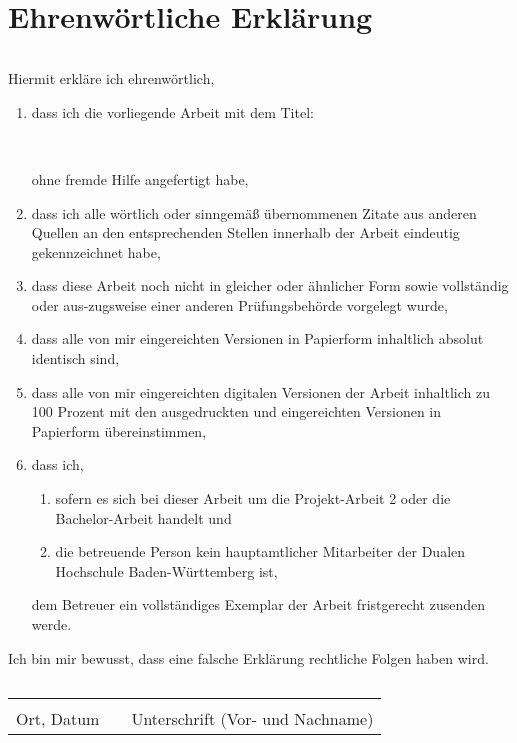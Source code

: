 \section*{Ehrenwörtliche Erklärung}\label{eidesstattliche}

\begin{verbatim}
\end{verbatim}
Hiermit erkläre ich ehrenwörtlich,
\begin{enumerate}
\item dass ich die vorliegende Arbeit mit dem Titel: \\\begin{itshape}\arbeitstitel\\\end{itshape}ohne fremde Hilfe angefertigt habe,
\item dass ich alle wörtlich oder sinngemäß übernommenen Zitate aus anderen Quellen an den entsprechenden Stellen innerhalb der Arbeit eindeutig gekennzeichnet habe,
\item dass diese Arbeit noch nicht in gleicher oder ähnlicher Form sowie vollständig oder aus-zugsweise einer anderen Prüfungsbehörde vorgelegt wurde,
\item dass alle von mir eingereichten Versionen in Papierform inhaltlich absolut identisch sind,
\item dass alle von mir eingereichten digitalen Versionen der Arbeit inhaltlich zu 100 Prozent mit den ausgedruckten und eingereichten Versionen in Papierform übereinstimmen,
\item dass ich,
\begin{enumerate}
\item sofern es sich bei dieser Arbeit um die Projekt-Arbeit 2 oder die Bachelor-Arbeit handelt und
\item die betreuende Person kein hauptamtlicher Mitarbeiter der Dualen Hochschule Baden-Württemberg ist,
\end{enumerate}
dem Betreuer ein vollständiges Exemplar der Arbeit fristgerecht zusenden werde.
\end{enumerate}
Ich bin mir bewusst, dass eine falsche Erklärung rechtliche Folgen haben wird.
\begin{verbatim}
\end{verbatim}
\begin{tabular}{lp{2em}l} 
\hspace{6cm}   && \hspace{4cm} \\\cline{1-1}\cline{3-3} 
Ort, Datum     && Unterschrift (Vor- und Nachname)
\end{tabular} 